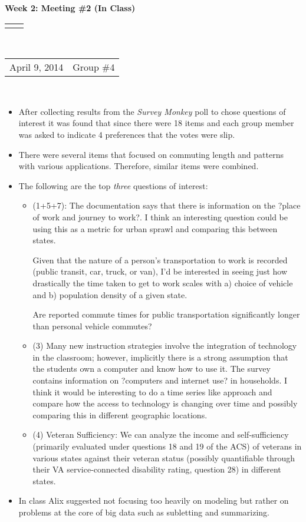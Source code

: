 \documentclass[12pt]{article}
\renewcommand{\title}[1]{\textbf{#1}\\}
\renewcommand{\line}{\begin{tabularx}{\textwidth}{X>{\raggedleft}X}\hline\\\end{tabularx}\\[-0.5cm]}
\newcommand{\leftright}[2]{\begin{tabularx}{\textwidth}{X>{\raggedleft}X}#1%
& #2\\\end{tabularx}\\[-0.5cm]}
\begin{document}
\title{Week 2: Meeting \#2 (In Class)}
\line
\leftright{April 9, 2014}{Group \#4} %
\vspace{5mm}

\begin{itemize}
\item After collecting results from the \emph{Survey Monkey} poll to chose questions of interest it was found that since there were 18 items and each group member was asked to indicate 4 preferences that the votes were slip. 
\item There were several items that focused on commuting length and patterns with various applications.  Therefore, similar items were combined. 
\item The following are the top \emph{three} questions of interest:
\begin{itemize}
\item (1+5+7): The documentation says that there is information on the ?place of work and journey to work?. I think an interesting question could be using this as a metric for urban sprawl and comparing this between states. 

Given that the nature of a person's transportation to work is recorded (public transit, car, truck, or van), I'd be interested in seeing just how drastically the time taken to get to work scales with a) choice of vehicle and b) population density of a given state.

Are reported commute times for public transportation significantly longer than personal vehicle commutes?
\item (3) Many new instruction strategies involve the integration of technology in the classroom; however, implicitly there is a strong assumption that the students own a computer and know how to use it. The survey contains information on ?computers and internet use? in households. I think it would be interesting to do a time series like approach and compare how the access to technology is changing over time and possibly comparing this in different geographic locations. 
\item (4) Veteran Sufficiency: We can analyze the income and self-sufficiency (primarily evaluated under questions 18 and 19 of the ACS) of veterans in various states against their veteran status (possibly quantifiable through their VA service-connected disability rating, question 28) in different states.
\end{itemize}
\item In class Alix suggested not focusing too heavily on modeling but rather on problems at the core of big data such as subletting and summarizing. 
\end{itemize}
\end{document}
